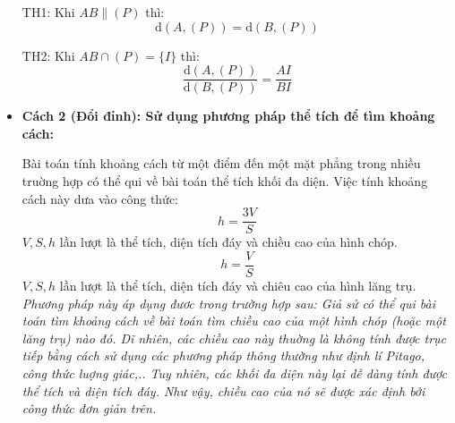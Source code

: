 \begin{khung}
\begin{itemize}
  TH1: Khi $AB \| (P)$ thì:$$\mathrm{d}(A,(P))=\mathrm{d}(B,(P))$$
  
  TH2: Khi $AB  \cap(P) = \{I\}$ thì:$$\dfrac{\mathrm{d}(A,(P))}{\mathrm{d}(B,(P))}=\dfrac{A I}{B I}$$
		
		\item \textbf{Cách 2 (Đổi đỉnh): Sử dụng phương pháp thể tích để tìm khoảng cách:}
		
		Bài toán tính khoảng cách từ một điểm đến một mặt phẳng trong nhiều truờng hợp có thể qui về bài toán thể tích khối đa diện. Việc tính khoảng cách này dưa vào công thức:\\
		$$h=\dfrac{3 V}{S}$$ $V, S, h$ lần lượt là thể tích, diện tích đáy và chiều cao của hình chóp.\\
		$$h=\dfrac{V}{S}$$ $V, S, h$ lần lượt là thể tích, diện tích đáy và chiêu cao của hình lăng trụ.\\
		
\textit{		Phương pháp này áp dụng đươc trong trường hợp sau: Giả sử có thể qui bài toán tìm khoảng cách về bài toán tìm chiều cao của một hình chóp (hoặc một lăng trụ) nào đó. Dĩ nhiên, các chiều cao này thuờng là không tính được trục tiếp bằng cách sử dụng các phương pháp thông thường như định lí Pitago, công thức luợng giác,.. Tuy nhiên, các khối đa diện này lại dễ dàng tính được thể tích và diện tích đáy. Như vậy, chiều cao của nó sẽ được xác định bởi công thức đơn giản trên.
		}
	\end{itemize}
\end{khung}
